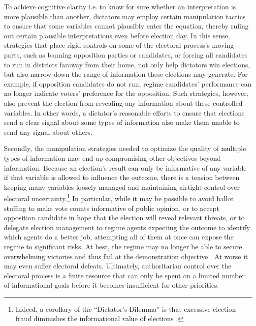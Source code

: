 \documentclass[12pt]{article}
\newcommand\fnote[1]{\footnote{\baselineskip=2\normalbaselineskip#1}}
\newcommand{\1}{\mathbbm{1}}
\begin{document}
To achieve cognitive clarity i.e. to know for sure whether an interpretation is more plausible than another, dictators may employ certain manipulation tactics to ensure that some variables cannot plausibly enter the equation, thereby ruling out certain plausible interpretations even before election day. In this sense, strategies that place rigid controls on some of the electoral process's moving parts, such as banning opposition parties or candidates, or forcing all candidates to run in districts faraway from their home, not only help dictators win elections, but also narrow down the range of information these elections may generate. For example, if opposition candidates do not run, regime candidates' performance can no longer indicate voters' preference for the opposition. Such strategies, however, also prevent the election from revealing any information about these controlled variables. In other words, a dictator's reasonable efforts to ensure that elections send a clear signal about some types of information also make them unable to send any signal about others.

Secondly, the manipulation strategies needed to optimize the quality of multiple types of information may end up compromising other objectives beyond information. Because an election's result can only be informative of any variable if that variable is allowed to influence the outcome, there is a tension between keeping many variables loosely managed and maintaining airtight control over electoral uncertainty.\fnote{Indeed, a corollary of the ``Dictator's Dilemma'' is that excessive election fraud diminishes the informational value of elections \citep{Wintrobe2000}. } In particular, while it may be possible to avoid ballot stuffing to make vote counts informative of public opinion, or to accept opposition candidate in hope that the election will reveal relevant threats, or to delegate election management to regime agents expecting the outcome to identify which agents do a better job, attempting all of them at once can expose the regime to significant risks. At best, the regime may no longer be able to secure overwhelming victories and thus fail at the demonstration objective \citep{Geddes2018}. At worse it may even suffer electoral defeats. Ultimately, authoritarian control over the electoral process is a finite resource that can only be spent on a limited number of informational goals before it becomes insufficient for other priorities.
\end{document}
